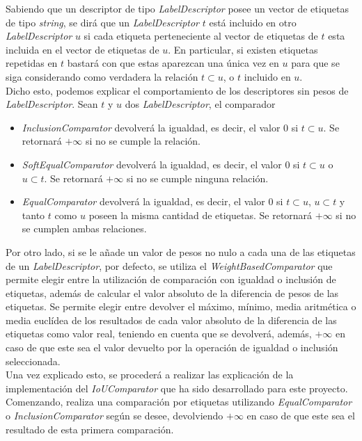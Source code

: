 Sabiendo que un descriptor de tipo \emph{LabelDescriptor} posee un vector de etiquetas de tipo \emph{string}, se dirá que un \emph{LabelDescriptor} $t$ está incluido en otro \emph{LabelDescriptor} $u$ si cada etiqueta perteneciente al vector de etiquetas de $t$ esta incluida en el vector de etiquetas de $u$. En particular, si existen etiquetas repetidas en $t$ bastará con que estas aparezcan una única vez en $u$ para que se siga considerando como verdadera la relación $t \subset u$, o $t$ incluido en $u$.\\

Dicho esto, podemos explicar el comportamiento de los descriptores sin pesos de \emph{LabelDescriptor}. Sean $t$ y $u$ dos \emph{LabelDescriptor}, el comparador
\begin{itemize}
\item \emph{InclusionComparator} devolverá la igualdad, es decir, el valor $0$ si $t\subset u$. Se retornará $+\infty$ si no se cumple la relación.
\item \emph{SoftEqualComparator} devolverá la igualdad, es decir, el valor $0$ si $t\subset u$ o $u\subset t$. Se retornará $+\infty$ si no se cumple ninguna relación.
\item \emph{EqualComparator} devolverá la igualdad, es decir, el valor $0$ si $t \subset u $, $u \subset t$ y tanto $t$ como $u$ poseen la misma cantidad de etiquetas. Se retornará $+\infty$ si no se cumplen ambas relaciones.
\end{itemize}

Por otro lado, si se le añade un valor de pesos no nulo a cada una de las etiquetas de un \emph{LabelDescriptor}, por defecto, se utiliza el \emph{WeightBasedComparator} que permite elegir entre la utilización de comparación con igualdad o inclusión de etiquetas, además de calcular el valor absoluto de la diferencia de pesos de las etiquetas. Se permite elegir entre devolver el máximo, mínimo, media aritmética o media euclídea de los resultados de cada valor absoluto de la diferencia de las etiquetas como valor real, teniendo en cuenta que se devolverá, además, $+\infty$ en caso de que este sea el valor devuelto por la operación de igualdad o inclusión seleccionada.\\

Una vez explicado esto, se procederá a realizar las explicación de la implementación del \emph{IoUComparator} que ha sido desarrollado para este proyecto.\\

Comenzando, realiza una comparación por etiquetas utilizando \emph{EqualComparator} o \emph{InclusionComparator} según se desee, devolviendo $+\infty$ en caso de que este sea el resultado de esta primera comparación.\\

